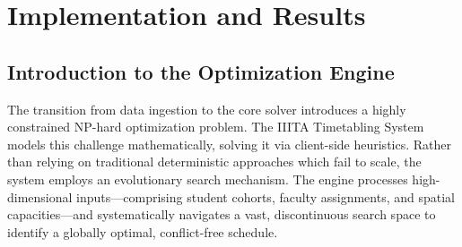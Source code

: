 
\chapter{Implementation and Results} %

\label{Chapter5}


\section{Introduction to the Optimization Engine}

The transition from data ingestion to the core solver introduces a highly constrained NP-hard optimization problem. The IIITA Timetabling System models this challenge mathematically, solving it via client-side heuristics. Rather than relying on traditional deterministic approaches which fail to scale, the system employs an evolutionary search mechanism. The engine processes high-dimensional inputs---comprising student cohorts, faculty assignments, and spatial capacities---and systematically navigates a vast, discontinuous search space to identify a globally optimal, conflict-free schedule.

